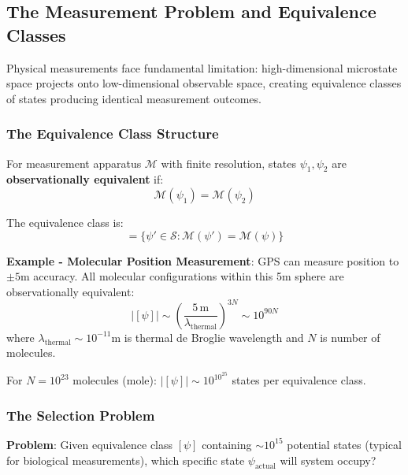 \documentclass[11pt,onecolumn]{article}
\begin{document}
\subsection{The Measurement Problem and Equivalence Classes}

Physical measurements face fundamental limitation: high-dimensional microstate space projects onto low-dimensional observable space, creating equivalence classes of states producing identical measurement outcomes.

\subsubsection{The Equivalence Class Structure}

\begin{definition}
For measurement apparatus $\mathcal{M}$ with finite resolution, states $\psi_1, \psi_2$ are \textbf{observationally equivalent} if:
\begin{equation}
\mathcal{M}(\psi_1) = \mathcal{M}(\psi_2)
\end{equation}

The equivalence class is:
\begin{equation}
[\psi] = \{\psi' \in \mathcal{S} : \mathcal{M}(\psi') = \mathcal{M}(\psi)\}
\end{equation}
\end{definition}

\textbf{Example - Molecular Position Measurement}: GPS can measure position to $\pm 5$m accuracy. All molecular configurations within this 5m sphere are observationally equivalent:
\begin{equation}
|[\psi]| \sim \left(\frac{5\,\text{m}}{\lambda_{\text{thermal}}}\right)^{3N} \sim 10^{90N}
\end{equation}
where $\lambda_{\text{thermal}} \sim 10^{-11}$m is thermal de Broglie wavelength and $N$ is number of molecules.

For $N = 10^{23}$ molecules (mole): $|[\psi]| \sim 10^{10^{25}}$ states per equivalence class.

\subsubsection{The Selection Problem}

\textbf{Problem}: Given equivalence class $[\psi]$ containing $\sim 10^{15}$ potential states (typical for biological measurements), which specific state $\psi_{\text{actual}}$ will system occupy?
\end{document}
